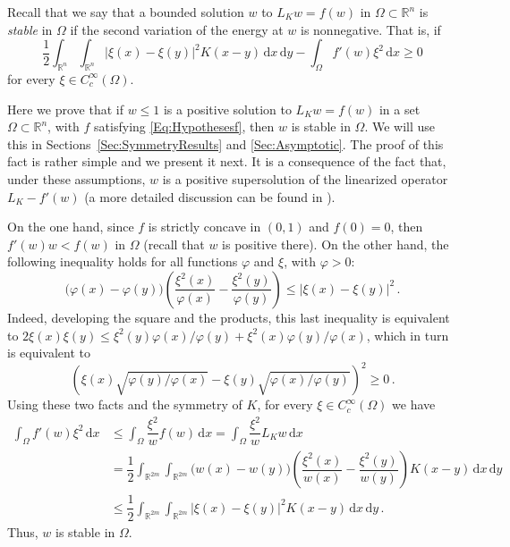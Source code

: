 \documentclass[12pt,reqno]{amsart}
\theoremstyle{definition}
\theoremstyle{remark}
\newcommand{\con}[1]{\mathbb{#1}}
\newcommand{\R}{\con{R}} %
\renewcommand{\d}{\,\mathrm{d}} %
\newcommand{\bpar}[1]{\left ( {#1}\right )}
\numberwithin{equation}{section}
\begin{document}
Recall that we say that a bounded solution $w$ to $L_K w = f(w)$ in $\Omega\subset \R^n$ is \emph{stable} in $\Omega$ if the second variation of the energy at $w$ is nonnegative. That is, if
\begin{equation*}
\label{Eq:StablityCondition}  
\dfrac{1}{2} \int_{\R^n} \int_{\R^n} |\xi (x) - \xi(y)|^2 K(x - y) \d x \d y - \int_{\Omega} f'(w) \xi^2 \d x \geq 0
\end{equation*}
for every $\xi \in C^\infty_c (\Omega)$.






Here we prove that if $w \leq 1$ is a positive solution to $L_K w = f(w)$ in a set $\Omega\subset \R^n$, with $f$ satisfying \eqref{Eq:Hypothesesf}, then $w$ is stable in $\Omega$. We will use this in Sections~\ref{Sec:SymmetryResults} and \ref{Sec:Asymptotic}. The proof of this fact is rather simple and we present it next. It is a consequence of the fact that, under these assumptions, $w$ is a positive supersolution of the linearized operator $L_K - f'(w)$ (a more detailed discussion can be found in \cite{HamelRosOtonSireValdinoci}). 

On the one hand, since $f$ is strictly concave in $(0,1)$ and $f(0)=0$, then $f'(w)w<f(w)$ in $\Omega$ (recall that $w$ is positive there). On the other hand, the following inequality holds for all functions $\varphi$ and $\xi$, with $\varphi>0$:
\begin{equation}
\label{Eq:IdentityStability}
\big (\varphi(x) - \varphi(y) \big) \bpar{\dfrac{\xi^2(x)}{\varphi(x)} - \dfrac{\xi^2(y)}{\varphi(y)} } \leq |\xi (x) - \xi(y)|^2\,.
\end{equation}
Indeed, developing the square and the products, this last inequality is equivalent to $2 \xi(x) \xi(y) \leq \xi^2(y) \varphi(x)/ \varphi(y) +  \xi^2 (x) \varphi(y) / \varphi(x)$, which in turn is equivalent to
$$
\bpar{\xi (x)\sqrt{\varphi(y) / \varphi(x)} - \xi(y) \sqrt{ \varphi(x)/ \varphi(y) } }^2 \geq 0\,.
$$
Using these two facts and the symmetry of $K$, for every $\xi\in C^\infty_c(\Omega)$ we have
\begin{align*}
\int_\Omega f'(w) \xi^2 \d x & \leq \int_\Omega  \dfrac{\xi^2}{w} f(w) \d x = \int_\Omega  \dfrac{\xi^2}{w} L_Kw \d x \\ 
&= \dfrac{1}{2} \int_{\R^{2m}} \int_{\R^{2m}} \big ( w(x) - w(y) \big) \bpar{\dfrac{\xi^2(x)}{w(x)} - \dfrac{\xi^2(y)}{w(y)} } K(x - y) \d x \d y
\\ 
&\leq \dfrac{1}{2} \int_{\R^{2m}} \int_{\R^{2m}} |\xi (x) - \xi(y)|^2 K(x - y) \d x \d y\,.
\end{align*}
Thus, $w$ is stable in $\Omega$. 
\end{document}
